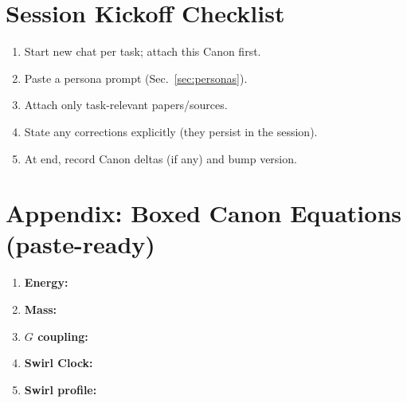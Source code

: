 \documentclass[11pt]{article}
\begin{document}
    \section{Session Kickoff Checklist}
    \begin{enumerate}
        \item Start new chat per task; attach this Canon first.
        \item Paste a persona prompt (Sec.~\ref{sec:personas}).
        \item Attach only task-relevant papers/sources.
        \item State any corrections explicitly (they persist in the session).
        \item At end, record Canon deltas (if any) and bump version.
    \end{enumerate}



    \section{Appendix: Boxed Canon Equations (paste-ready)}
    \begin{enumerate}
        \item \textbf{Energy:} 
        \item \textbf{Mass:} 
        \item \textbf{$G$ coupling:} 
        \item \textbf{Swirl Clock:} 
        \item \textbf{Swirl profile:} 
    \end{enumerate}

\end{document}
